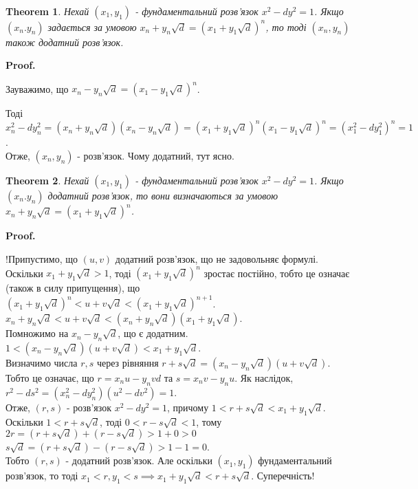 \documentclass[a4paper, 14pt]{extarticle}
\makeatletter
\theoremstyle{theoremdd}
\newtheorem{theorem}{Theorem}[subsection]
\theoremstyle{theoremdd}
\theoremstyle{theoremdd}
\theoremstyle{theoremdd}
\theoremstyle{theoremdd}
\theoremstyle{theoremdd}
\theoremstyle{theoremdd}
\theoremstyle{theoremdd}
\def\qed{$\blacksquare$}
\renewenvironment{proof}[1][Proof.\\]{\par
\pushQED{\hfill \qed}%
\normalfont \topsep6\p@\@plus6\p@\relax
\trivlist
\item\relax
{\bfseries
#1\@addpunct{.}}\hspace\labelsep\ignorespaces
}{%
\popQED\endtrivlist\@endpefalse
}
\makeatother
\begin{document}
\begin{theorem}
Нехай $(x_1,y_1)$ - фундаментальний розв'язок $x^2 - dy^2 = 1$. Якщо $(x_n.y_n)$ задається за умовою $x_n + y_n \sqrt{d} = \left(x_1 + y_1 \sqrt{d}\right)^n$, то тоді $(x_n,y_n)$ також додатний розв'язок.
\end{theorem}

\begin{proof}
Зауважимо, що $x_n - y_n \sqrt{d} = \left(x_1 - y_1 \sqrt{d} \right)^n$.
\iffalse
\textit{Вказівка: з'ясувати, чому дорівнюють $x_n,y_n$ із початкового рівняння. Розкрити за біномом Ньютона, записати члени без $\sqrt{d}$ та з $\sqrt{d}$.}
\fi
Тоді\\
$x_n^2 - dy_n^2 = \left( x_n + y_n \sqrt{d} \right)\left( x_n - y_n \sqrt{d} \right) = \left( x_1 + y_1 \sqrt{d} \right)^n \left( x_1 - y_1 \sqrt{d} \right)^n = (x_1^2 - dy_1^2)^n = 1$.\\
Отже, $(x_n,y_n)$ - розв'язок. Чому додатний, тут ясно.
\end{proof}

\begin{theorem}
Нехай $(x_1,y_1)$ - фундаментальний розв'язок $x^2 - dy^2 = 1$. Якщо $(x_n.y_n)$ додатний розв'язок, то вони визначаються за умовою $x_n + y_n \sqrt{d} = \left(x_1 + y_1 \sqrt{d}\right)^n$.
\end{theorem}

\begin{proof}
!Припустимо, що $(u,v)$ додатний розв'язок, що не задовольняє формулі. Оскільки $x_1 + y_1 \sqrt{d} > 1$, тоді $\left(x_1 + y_1 \sqrt{d}\right)^n$ зростає постійно, тобто це означає (також в силу припущення), що\\
$\left(x_1 + y_1 \sqrt{d} \right)^n < u + v \sqrt{d} < \left( x_1 + y_1 \sqrt{d} \right)^{n+1}$.\\
$x_n + y_n \sqrt{d} < u + v \sqrt{d} < \left( x_n + y_n \sqrt{d}\right) \left( x_1 + y_1 \sqrt{d}\right)$.\\
Помножимо на $x_n - y_n \sqrt{d}$, що є додатним.\\
$1 < \left(x_n - y_n \sqrt{d}\right)\left( u + v \sqrt{d} \right) < x_1 + y_1 \sqrt{d}$.\\
Визначимо числа $r,s$ через рівняння $r + s \sqrt{d} = \left( x_n - y_n \sqrt{d} \right)\left( u + v \sqrt{d} \right)$. Тобто це означає, що $r = x_n u - y_n vd$ та $s = x_n v - y_n u$. Як наслідок,\\
$r^2 - ds^2 = (x_n^2 - dy_n^2) (u^2-dv^2) = 1$.\\
Отже, $(r,s)$ - розв'язок $x^2 - dy^2 = 1$, причому $1 < r + s \sqrt{d} < x_1 + y_1 \sqrt{d}$.\\
Оскільки $1 < r + s \sqrt{d}$, тоді $0 < r - s \sqrt{d} < 1$, тому\\
$2r = \left(r+s \sqrt{d} \right)  + \left(r- s \sqrt{d}\right) > 1 + 0 > 0$\\
$s \sqrt{d} = \left(r + s \sqrt{d}\right) - \left(r - s \sqrt{d}\right) > 1 - 1  = 0$.\\
Тобто $(r,s)$ - додатний розв'язок. Але оскільки $(x_1,y_1)$ фундаментальний розв'язок, то тоді $x_1 < r, y_1 < s \implies x_1 + y_1 \sqrt{d} < r + s \sqrt{d}$. Суперечність!
\end{proof}
\newpage
\end{document}
